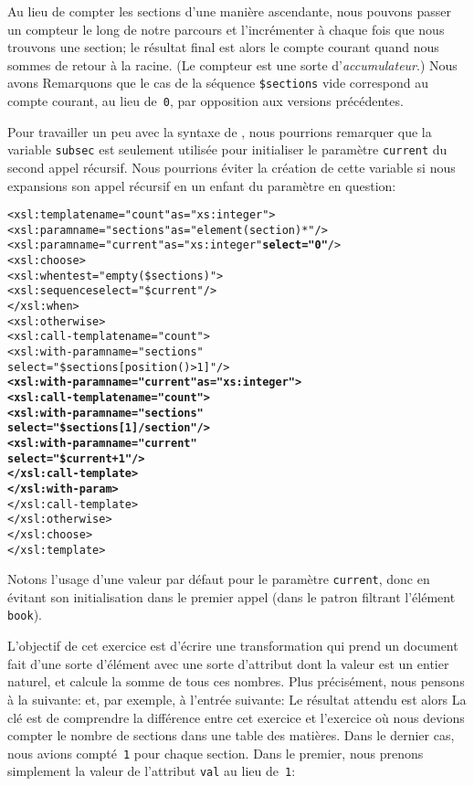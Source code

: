 Au lieu de compter les sections d'une manière ascendante, nous pouvons
passer un compteur le long de notre parcours et l'incrémenter à chaque
fois que nous trouvons une section; le résultat final est alors le
compte courant quand nous sommes de retour à la racine. (Le compteur
est une sorte d'\emph{accumulateur}.) Nous avons
\noindent Remarquons que le cas de la séquence \texttt{\$sections}
vide correspond au compte courant, au lieu de~\texttt{0}, par
opposition aux versions précédentes.

Pour travailler un peu avec la syntaxe de \XSLT, nous pourrions
remarquer que la variable \texttt{subsec} est seulement utilisée pour
initialiser le paramètre \texttt{current} du second appel
récursif. Nous pourrions éviter la création de cette variable si nous
expansions son appel récursif en un enfant du paramètre en question:
\begin{alltt}
\small  <xsl:template name="count" as="xs:integer">
    <xsl:param name="sections" as="element(section)*"/>
    <xsl:param name="current"  as="xs:integer" \textbf{select="0"}/>
    <xsl:choose>
      <xsl:when test="empty(\$sections)">
        <xsl:sequence select="\$current"/>
      </xsl:when>
      <xsl:otherwise>
        <xsl:call-template name="count">
          <xsl:with-param name="sections"
                          select="\$sections[position()>1]"/>
          \textbf{<xsl:with-param name="current" as="xs:integer">
            <xsl:call-template name="count">
              <xsl:with-param name="sections"
                              select="\$sections[1]/section"/>
              <xsl:with-param name="current"
                              select="\$current + 1"/>
            </xsl:call-template>
          </xsl:with-param>}
        </xsl:call-template>
      </xsl:otherwise>
    </xsl:choose>
  </xsl:template>
\end{alltt}
Notons l'usage d'une valeur par défaut pour le paramètre
\texttt{current}, donc en évitant son initialisation dans le premier
appel (dans le patron filtrant l'élément \texttt{book}).



\hspace*{-3pt} L'objectif de cet exercice est d'écrire une
transformation \XSLT qui prend un document fait d'une sorte d'élément
avec une sorte d'attribut dont la valeur est un entier naturel, et
calcule la somme de tous ces nombres. Plus précisément, nous pensons à
la \DTD suivante: 
\noindent et, par exemple, à l'entrée suivante:
\noindent Le résultat attendu est alors
{\small} La clé est de comprendre
la différence entre cet exercice et l'exercice où nous devions compter
le nombre de sections dans une table des matières. Dans le dernier
cas, nous avions compté~\texttt{1} pour chaque section. Dans le
premier, nous prenons simplement la valeur de l'attribut \texttt{val}
au lieu de~\texttt{1}: 

